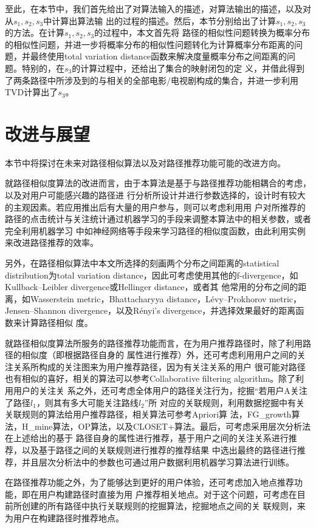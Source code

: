 至此，在本节中，我们首先给出了对算法输入的描述，对算法输出的描述，以及对从$s_1,s_2,s_3$中计算出算法输
出的过程的描述。然后，本节分别给出了计算$s_1,s_2,s_3$的方法。在计算$s_1,s_2,s_3$的过程中，本文首先将
路径的相似性问题转换为概率分布的相似性问题，并进一步将概率分布的相似性问题转化为计算概率分布距离的问
题，并最终使用total variation
distance函数来解决度量概率分布之间距离的问题。特别的，在$s_3$的计算过程中，还给出了集合的映射闭包的定
义，并借此得到了两条路径中所涉及到的与相关的全部电影/电视剧构成的集合，并进一步利用TVD计算出了$s_3$。

\section{改进与展望}
本节中将探讨在未来对路径相似算法以及对路径推荐功能可能的改进方向。

就路径相似度算法的改进而言，由于本算法是基于与路径推荐功能相耦合的考虑，以及对用户可能感兴趣的路径进
行分析所设计并进行参数选择的，设计时有较大的主观因素。若应用推出后有大量的用户参与，则可以考虑利用用
户对所推荐的路径的点击统计与关注统计通过机器学习的手段来调整本算法中的相关参数，或者完全利用机器学习
中如神经网络等手段来学习路径的相似度函数，由此利用实例来改进路径推荐的效率。

另外，在路径相似算法中本文所选择的刻画两个分布之间距离的statistical distribution为total variation
distance，因此可考虑使用其他的f-divergence，如Kullback–Leibler divergence或Hellinger distance，或者其
他常用的分布之间的距离，如Wasserstein metric，Bhattacharyya distance，Lévy–Prokhorov
metric，Jensen–Shannon divergence，以及Rényi's divergence，并选择效果最好的距离函数来计算路径相似
度。

就路径相似度算法所服务的路径推荐功能而言，在为用户推荐路径时，除了利用路径的相似度（即根据路径自身的
属性进行推荐）外，还可考虑利用用户之间的关注关系所构成的关注图来为用户推荐路径，因为有关注关系的用户
很可能对路径也有相似的喜好，相关的算法可以参考Collaborative filtering algorithm。除了利用用户的关注关
系之外，还可考虑全体用户的路径关注行为，挖掘“若用户A关注了路径$l_1$，则其有多大可能关注路线$l_2$”所
对应的关联规则，利用数据挖掘中有关关联规则的算法给用户推荐路径，相关算法可参考Apriori算
法，FG\_growth算法，H\_mine算法，OP算法，以及CLOSET+算法。最后，可考虑采用层次分析法在上述给出的基于
路径自身的属性进行推荐，基于用户之间的关注关系进行推荐，以及基于路径之间的关联规则进行推荐的推荐结果
中选出最终的路径进行推荐，并且层次分析法中的参数也可通过用户数据利用机器学习算法进行训练。

在路径推荐功能之外，为了能够达到更好的用户体验，还可考虑加入地点推荐功能，即在用户构建路径时直接为用
户推荐相关地点。对于这个问题，可考虑在目前所创建的所有路径中执行关联规则的挖掘算法，挖掘地点之间的关
联规则，来为用户在构建路径时推荐地点。



